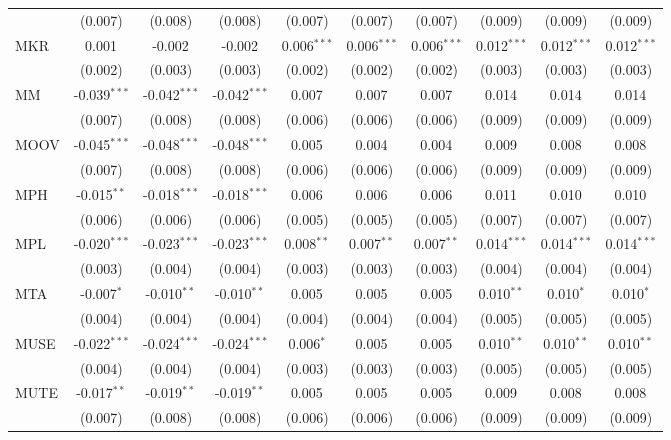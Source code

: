\begin{table}[!htbp]
\begin{tabular}{@{\extracolsep{5pt}}lccccccccc}
  & (0.007) & (0.008) & (0.008) & (0.007) & (0.007) & (0.007) & (0.009) & (0.009) & (0.009) \\
 MKR & 0.001$^{}$ & -0.002$^{}$ & -0.002$^{}$ & 0.006$^{***}$ & 0.006$^{***}$ & 0.006$^{***}$ & 0.012$^{***}$ & 0.012$^{***}$ & 0.012$^{***}$ \\
  & (0.002) & (0.003) & (0.003) & (0.002) & (0.002) & (0.002) & (0.003) & (0.003) & (0.003) \\
 MM & -0.039$^{***}$ & -0.042$^{***}$ & -0.042$^{***}$ & 0.007$^{}$ & 0.007$^{}$ & 0.007$^{}$ & 0.014$^{}$ & 0.014$^{}$ & 0.014$^{}$ \\
  & (0.007) & (0.008) & (0.008) & (0.006) & (0.006) & (0.006) & (0.009) & (0.009) & (0.009) \\
 MOOV & -0.045$^{***}$ & -0.048$^{***}$ & -0.048$^{***}$ & 0.005$^{}$ & 0.004$^{}$ & 0.004$^{}$ & 0.009$^{}$ & 0.008$^{}$ & 0.008$^{}$ \\
  & (0.007) & (0.008) & (0.008) & (0.006) & (0.006) & (0.006) & (0.009) & (0.009) & (0.009) \\
 MPH & -0.015$^{**}$ & -0.018$^{***}$ & -0.018$^{***}$ & 0.006$^{}$ & 0.006$^{}$ & 0.006$^{}$ & 0.011$^{}$ & 0.010$^{}$ & 0.010$^{}$ \\
  & (0.006) & (0.006) & (0.006) & (0.005) & (0.005) & (0.005) & (0.007) & (0.007) & (0.007) \\
 MPL & -0.020$^{***}$ & -0.023$^{***}$ & -0.023$^{***}$ & 0.008$^{**}$ & 0.007$^{**}$ & 0.007$^{**}$ & 0.014$^{***}$ & 0.014$^{***}$ & 0.014$^{***}$ \\
  & (0.003) & (0.004) & (0.004) & (0.003) & (0.003) & (0.003) & (0.004) & (0.004) & (0.004) \\
 MTA & -0.007$^{*}$ & -0.010$^{**}$ & -0.010$^{**}$ & 0.005$^{}$ & 0.005$^{}$ & 0.005$^{}$ & 0.010$^{**}$ & 0.010$^{*}$ & 0.010$^{*}$ \\
  & (0.004) & (0.004) & (0.004) & (0.004) & (0.004) & (0.004) & (0.005) & (0.005) & (0.005) \\
 MUSE & -0.022$^{***}$ & -0.024$^{***}$ & -0.024$^{***}$ & 0.006$^{*}$ & 0.005$^{}$ & 0.005$^{}$ & 0.010$^{**}$ & 0.010$^{**}$ & 0.010$^{**}$ \\
  & (0.004) & (0.004) & (0.004) & (0.003) & (0.003) & (0.003) & (0.005) & (0.005) & (0.005) \\
 MUTE & -0.017$^{**}$ & -0.019$^{**}$ & -0.019$^{**}$ & 0.005$^{}$ & 0.005$^{}$ & 0.005$^{}$ & 0.009$^{}$ & 0.008$^{}$ & 0.008$^{}$ \\
  & (0.007) & (0.008) & (0.008) & (0.006) & (0.006) & (0.006) & (0.009) & (0.009) & (0.009) \\

\end{tabular}
\end{table}
